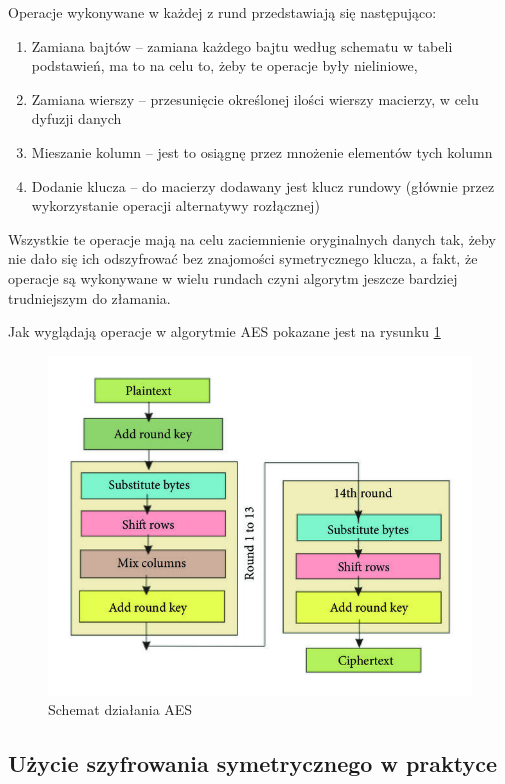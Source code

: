 Operacje wykonywane w każdej z rund przedstawiają się następująco:
\begin{enumerate}
    \item Zamiana bajtów – zamiana każdego bajtu według schematu w tabeli podstawień, ma to na celu to, żeby te operacje były nieliniowe,
    \item Zamiana wierszy – przesunięcie określonej ilości wierszy macierzy, w celu dyfuzji danych
    \item Mieszanie kolumn – jest to osiągnę przez mnożenie elementów tych kolumn
    \item Dodanie klucza – do macierzy dodawany jest klucz rundowy (głównie przez wykorzystanie operacji alternatywy rozłącznej)
\end{enumerate}
Wszystkie te operacje mają na celu zaciemnienie oryginalnych danych tak, żeby nie dało się ich odszyfrować bez znajomości symetrycznego klucza, a fakt, że operacje są wykonywane w wielu rundach czyni algorytm jeszcze bardziej trudniejszym do złamania.

\vspace{0.3\baselineskip}

Jak wyglądają operacje w algorytmie AES pokazane jest na rysunku \ref{fig:AES2}
\begin{figure}[H]
    \centering
    \includegraphics[width=\textwidth]{Images/AES2.jpg}
    \caption{Schemat działania AES}
    \label{fig:AES2}
\end{figure}

\subsection{Użycie szyfrowania symetrycznego w praktyce}

